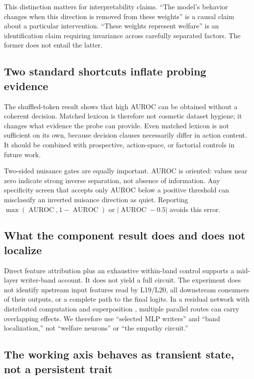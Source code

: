 \documentclass[10pt,twocolumn]{article}
\newcommand{\auc}{\operatorname{AUROC}}
\newcommand{\twosidedauc}{\max(\auc,1-\auc)}
\begin{document}
This distinction matters for interpretability claims. ``The model's behavior
changes when this direction is removed from these weights'' is a causal claim
about a particular intervention. ``These weights represent welfare'' is an
identification claim requiring invariance across carefully separated factors.
The former does not entail the latter.

\subsection{Two standard shortcuts inflate probing evidence}

The shuffled-token result shows that high AUROC can be obtained without a
coherent decision. Matched lexicon is therefore not cosmetic dataset hygiene;
it changes what evidence the probe can provide. Even matched lexicon is not
sufficient on its own, because decision clauses necessarily differ in action
content. It should be combined with prospective, action-space, or factorial
controls in future work.

Two-sided nuisance gates are equally important. AUROC is oriented: values near
zero indicate strong inverse separation, not absence of information. Any
specificity screen that accepts only AUROC below a positive threshold can
misclassify an inverted nuisance direction as quiet. Reporting
$\twosidedauc$ or $|\auc-0.5|$ avoids this error.

\subsection{What the component result does and does not localize}

Direct feature attribution plus an exhaustive within-band control supports a
mid-layer writer-band account. It does not yield a full circuit. The experiment
does not identify upstream input features read by L19/L20, all downstream
consumers of their outputs, or a complete path to the final logits. In a
residual network with distributed computation and superposition
\cite{elhage2022toy}, multiple parallel routes can carry overlapping effects.
We therefore use ``selected MLP writers'' and ``band localization,'' not
``welfare neurons'' or ``the empathy circuit.''

\subsection{The working axis behaves as transient state, not a persistent trait}
\label{sec:state-trait}
\end{document}

